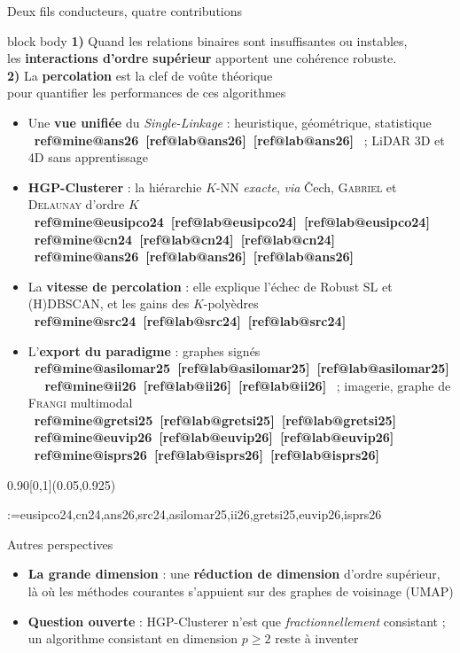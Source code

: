 \documentclass[A4,svgnames,9pt,aspectratio=169]{beamer}
\makeatletter
\newcommand{\refbracket}[1]{%
  \ifcsname ref@mine@#1\endcsname
    \textcolor{inria-rouge}{[\csname ref@lab@#1\endcsname]}%
  \else
    \textcolor{gris_fonce_inria}{[\csname ref@lab@#1\endcsname]}%
  \fi}
\newcommand{\citb}[1]{\mbox{{\footnotesize\bfseries\refbracket{#1}}}}
\newcommand{\reffoot}[1]{%
  \begin{textblock}{0.90}[0,1](0.05,0.925)%
    \begingroup
    \tiny\linespread{0.90}\selectfont\raggedright\color{gris_fonce_inria}%
    \setlength{\parindent}{0pt}\setlength{\parskip}{0pt}%
    \edef\rf@list{\zap@space#1 \@empty}%
    \@for\rf@key:=\rf@list\do{%
      \noindent{\bfseries\expandafter\refbracket\expandafter{\rf@key}}%
      \space\csname ref@full@\rf@key\endcsname\par}%
    \endgroup
  \end{textblock}}
\makeatother
\begin{document}
\begin{frame}[t]{Deux fils conducteurs, quatre contributions}
    \vspace{-0.10cm}
    \begin{beamercolorbox}[rounded=true,sep=3pt]{block body}
        \centering\small
        \textbf{1)} Quand les relations binaires sont insuffisantes ou instables,\\ les \textbf{interactions d'ordre supérieur} apportent une cohérence robuste.\\[3pt]
        \textbf{2)} La \textbf{percolation} est la clef de voûte théorique\\ pour quantifier les performances de ces algorithmes
    \end{beamercolorbox}

    \vspace{0.06cm}
    \footnotesize
    \begin{itemize}
        \setlength{\itemsep}{3pt}
        \item Une \textbf{vue unifiée} du \emph{Single-Linkage} : heuristique, géométrique, statistique \citb{ans26} ; LiDAR 3D et 4D sans apprentissage
        \item \textbf{HGP-Clusterer} : la hiérarchie $K$-NN \emph{exacte}, \emph{via} \v{C}ech, \textsc{Gabriel} et \textsc{Delaunay} d'ordre $K$ \citb{eusipco24} \citb{cn24} \citb{ans26}
        \item La \textbf{vitesse de percolation} : elle explique l'échec de Robust SL et (H)DBSCAN, et les gains des $K$-polyèdres \citb{src24}
        \item L'\textbf{export du paradigme} : graphes signés \citb{asilomar25} \citb{ii26} ; imagerie, graphe de \textsc{Frangi} multimodal \citb{gretsi25} \citb{euvip26} \citb{isprs26}
    \end{itemize}
    \reffoot{eusipco24,cn24,ans26,src24,asilomar25,ii26,gretsi25,euvip26,isprs26}
\end{frame}

\begin{frame}{Autres perspectives}
    \begin{itemize}
        \setlength{\itemsep}{11pt}
        \item \textbf{La grande dimension} : une \textbf{réduction de dimension} d'ordre supérieur,
        là où les méthodes courantes s'appuient sur des graphes de voisinage (UMAP)
        \item \textbf{Question ouverte} : HGP-Clusterer n'est que \emph{fractionnellement} consistant ;
        un algorithme consistant en dimension $p \ge 2$ reste à inventer
    \end{itemize}
\end{frame}
\end{document}
